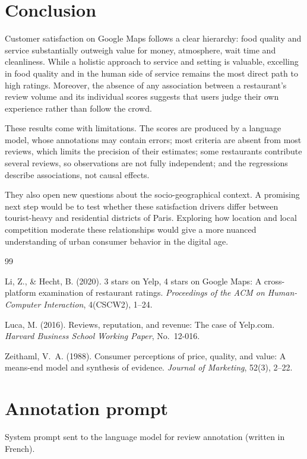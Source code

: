 \documentclass[11pt,a4paper]{article}
\begin{document}
\section{Conclusion}

Customer satisfaction on Google Maps follows a clear hierarchy: food quality
and service substantially outweigh value for money, atmosphere, wait time and
cleanliness. While a holistic approach to service and setting is valuable,
excelling in food quality and in the human side of service remains the most
direct path to high ratings. Moreover, the absence of any association between
a restaurant's review volume and its individual scores suggests that users
judge their own experience rather than follow the crowd.

These results come with limitations. The scores are produced by a language
model, whose annotations may contain errors; most criteria are absent from
most reviews, which limits the precision of their estimates; some
restaurants contribute several reviews, so observations are not fully
independent; and the regressions describe associations, not causal
effects.

They also open new questions about the socio-geographical context. A
promising next step would be to test whether these satisfaction drivers
differ between tourist-heavy and residential districts of Paris. Exploring how
location and local competition moderate these relationships would give a more
nuanced understanding of urban consumer behavior in the digital age.

\begin{thebibliography}{99}
\setlength{\itemsep}{1pt}\small

Li, Z., \& Hecht, B. (2020). 3 stars on Yelp, 4 stars on Google Maps: A
cross-platform examination of restaurant ratings. \emph{Proceedings of the
ACM on Human-Computer Interaction}, 4(CSCW2), 1--24.

Luca, M. (2016). Reviews, reputation, and revenue: The case of Yelp.com.
\emph{Harvard Business School Working Paper}, No.~12-016.

Zeithaml, V.~A. (1988). Consumer perceptions of price, quality, and value: A
means-end model and synthesis of evidence. \emph{Journal of Marketing},
52(3), 2--22.

\end{thebibliography}

\appendix
\section{Annotation prompt}
\label{app:prompt}

System prompt sent to the language model for review annotation (written in
French).

\end{document}

